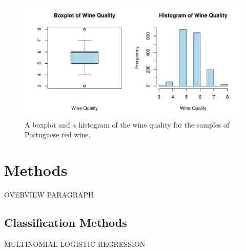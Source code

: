 \documentclass[12pt]{article}
\begin{document}
\begin{figure}[tbp]
 \centering
 \includegraphics[width=\textwidth]{manuscriptfigure.pdf}
 \caption{A boxplot and a histogram of the wine quality for the samples of Portuguese red wine.}
 \label{fig:wine}
\end{figure}

\section{Methods}
\label{sec:meth}

OVERVIEW PARAGRAPH

\subsection{Classification Methods}
\label{sec:class}

MULTINOMIAL LOGISTIC REGRESSION
\end{document}
